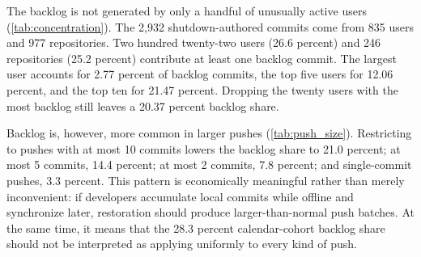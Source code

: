 The backlog is not generated by only a handful of unusually active users (\cref{tab:concentration}). The 2,932 shutdown-authored commits come from 835 users and 977 repositories. Two hundred twenty-two users (26.6 percent) and 246 repositories (25.2 percent) contribute at least one backlog commit. The largest user accounts for 2.77 percent of backlog commits, the top five users for 12.06 percent, and the top ten for 21.47 percent. Dropping the twenty users with the most backlog still leaves a 20.37 percent backlog share.

Backlog is, however, more common in larger pushes (\cref{tab:push_size}). Restricting to pushes with at most 10 commits lowers the backlog share to 21.0 percent; at most 5 commits, 14.4 percent; at most 2 commits, 7.8 percent; and single-commit pushes, 3.3 percent. This pattern is economically meaningful rather than merely inconvenient: if developers accumulate local commits while offline and synchronize later, restoration should produce larger-than-normal push batches. At the same time, it means that the 28.3 percent calendar-cohort backlog share should not be interpreted as applying uniformly to every kind of push.
